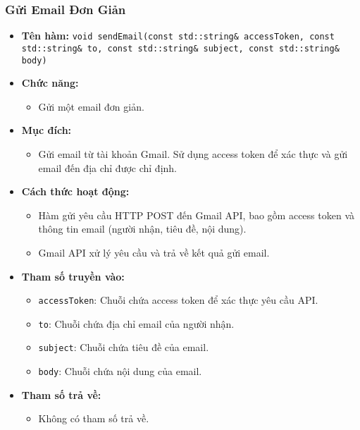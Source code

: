 \subsubsection{Gửi Email Đơn Giản}
\begin{itemize}
    \item \textbf{Tên hàm:} \texttt{void sendEmail(const std::string\& accessToken, const std::string\& to, const std::string\& subject, const std::string\& body)}
    \item \textbf{Chức năng:} 
    \begin{itemize}
        \item Gửi một email đơn giản.
    \end{itemize}
    \item \textbf{Mục đích:} 
    \begin{itemize}
        \item Gửi email từ tài khoản Gmail. Sử dụng access token để xác thực và gửi email đến địa chỉ được chỉ định.
    \end{itemize}
    \item \textbf{Cách thức hoạt động:} 
    \begin{itemize}
        \item Hàm gửi yêu cầu HTTP POST đến Gmail API, bao gồm access token và thông tin email (người nhận, tiêu đề, nội dung).
        \item Gmail API xử lý yêu cầu và trả về kết quả gửi email.
    \end{itemize}
    \item \textbf{Tham số truyền vào:} 
    \begin{itemize}
        \item \texttt{accessToken}: Chuỗi chứa access token để xác thực yêu cầu API.
        \item \texttt{to}: Chuỗi chứa địa chỉ email của người nhận.
        \item \texttt{subject}: Chuỗi chứa tiêu đề của email.
        \item \texttt{body}: Chuỗi chứa nội dung của email.
    \end{itemize}
    \item \textbf{Tham số trả về:} 
    \begin{itemize}
        \item Không có tham số trả về.
    \end{itemize}
\end{itemize}

